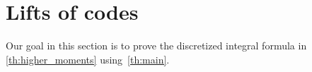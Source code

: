 \documentclass{amsart}
\theoremstyle{definition}
\theoremstyle{remark}
\newcommand{\OK}{\mathcal{O}_K}
\begin{document}
\section{Lifts of codes}
\label{se:lifts_of_codes}


Our goal in this section is to prove the discretized integral formula in \cref{th:higher_moments} using~\cref{th:main}. 
\end{document}
